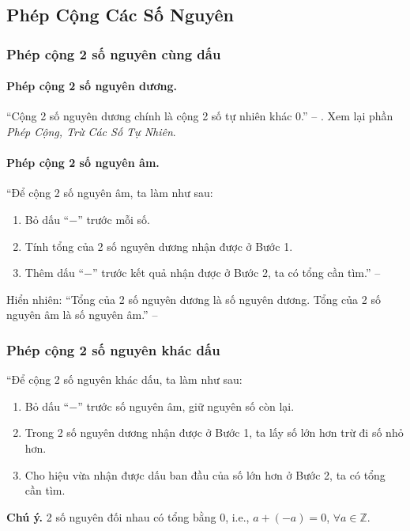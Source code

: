 \documentclass{article}
\numberwithin{equation}{section}
\begin{document}

\subsection{Phép Cộng Các Số Nguyên}

\subsubsection{Phép cộng 2 số nguyên cùng dấu}

\paragraph{Phép cộng 2 số nguyên dương.} ``Cộng 2 số nguyên dương chính là cộng 2 số tự nhiên khác 0.'' -- \cite[p. 70]{SGK_Toan_6_Canh_Dieu_tap_1}. Xem lại phần \textit{Phép Cộng, Trừ Các Số Tự Nhiên}.

\paragraph{Phép cộng 2 số nguyên âm.} ``Để cộng 2 số nguyên âm, ta làm như sau:
\begin{enumerate}
	\item Bỏ dấu ``$-$'' trước mỗi số.
	\item Tính tổng của 2 số nguyên dương nhận được ở Bước 1.
	\item Thêm dấu ``$-$'' trước kết quả nhận được ở Bước 2, ta có tổng cần tìm.'' -- \cite[p. 71]{SGK_Toan_6_Canh_Dieu_tap_1}
\end{enumerate}
Hiển nhiên: ``Tổng của 2 số nguyên dương là số nguyên dương. Tổng của 2 số nguyên âm là số nguyên âm.'' -- \cite[p. 71]{SGK_Toan_6_Canh_Dieu_tap_1}

\subsubsection{Phép cộng 2 số nguyên khác dấu}
``Để cộng 2 số nguyên khác dấu, ta làm như sau:
\begin{enumerate}
	\item Bỏ dấu ``$-$'' trước số nguyên âm, giữ nguyên số còn lại.
	\item Trong 2 số nguyên dương nhận được ở Bước 1, ta lấy số lớn hơn trừ đi số nhỏ hơn.
	\item Cho hiệu vừa nhận được dấu ban đầu của số lớn hơn ở Bước 2, ta có tổng cần tìm.
\end{enumerate}
\textbf{Chú ý.} 2 số nguyên đối nhau có tổng bằng 0, i.e., $a + (-a) = 0$, $\forall a\in\mathbb{Z}$.
\end{document}
